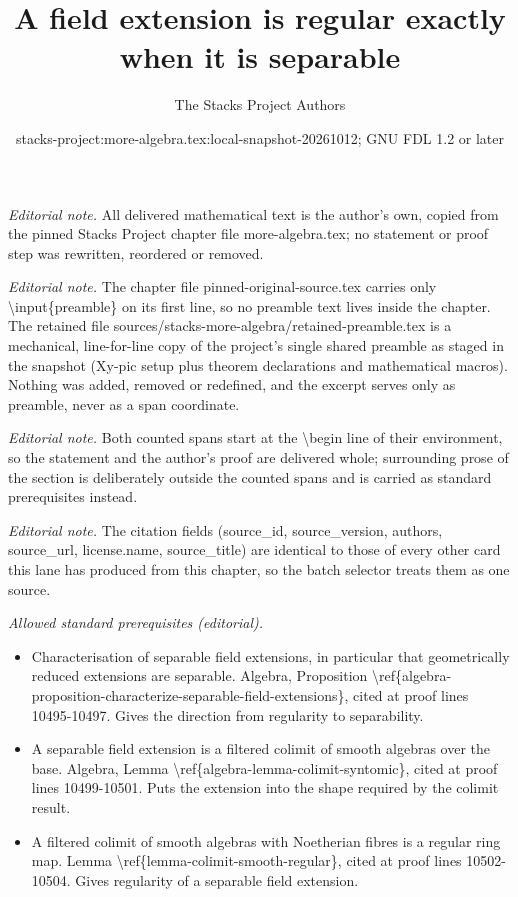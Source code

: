\documentclass[10pt,a4paper]{amsart}
\title{A field extension is regular exactly when it is separable}
\author{The Stacks Project Authors}
\date{stacks-project:more-algebra.tex:local-snapshot-20261012; GNU FDL 1.2 or later}
\theoremstyle{plain}
\theoremstyle{definition}
\theoremstyle{remark}
\numberwithin{equation}{subsection}
\begin{document}
\maketitle
\setcounter{subsection}{1}
\noindent\textit{Editorial note.} All delivered mathematical text is the author's own, copied from the pinned Stacks Project chapter file more-algebra.tex; no statement or proof step was rewritten, reordered or removed.\par\medskip
\noindent\textit{Editorial note.} The chapter file pinned-original-source.tex carries only \textbackslash{}input\{preamble\} on its first line, so no preamble text lives inside the chapter. The retained file sources/stacks-more-algebra/retained-preamble.tex is a mechanical, line-for-line copy of the project's single shared preamble as staged in the snapshot (Xy-pic setup plus theorem declarations and mathematical macros). Nothing was added, removed or redefined, and the excerpt serves only as preamble, never as a span coordinate.\par\medskip
\noindent\textit{Editorial note.} Both counted spans start at the \textbackslash{}begin line of their environment, so the statement and the author's proof are delivered whole; surrounding prose of the section is deliberately outside the counted spans and is carried as standard prerequisites instead.\par\medskip
\noindent\textit{Editorial note.} The citation fields (source\_id, source\_version, authors, source\_url, license.name, source\_title) are identical to those of every other card this lane has produced from this chapter, so the batch selector treats them as one source.\par\medskip
\noindent\textit{Allowed standard prerequisites (editorial).}\begin{itemize}
\item Characterisation of separable field extensions, in particular that geometrically reduced extensions are separable. Algebra, Proposition \textbackslash{}ref\{algebra-proposition-characterize-separable-field-extensions\}, cited at proof lines 10495-10497. Gives the direction from regularity to separability.
\item A separable field extension is a filtered colimit of smooth algebras over the base. Algebra, Lemma \textbackslash{}ref\{algebra-lemma-colimit-syntomic\}, cited at proof lines 10499-10501. Puts the extension into the shape required by the colimit result.
\item A filtered colimit of smooth algebras with Noetherian fibres is a regular ring map. Lemma \textbackslash{}ref\{lemma-colimit-smooth-regular\}, cited at proof lines 10502-10504. Gives regularity of a separable field extension.
\end{itemize}\medskip
\end{document}
